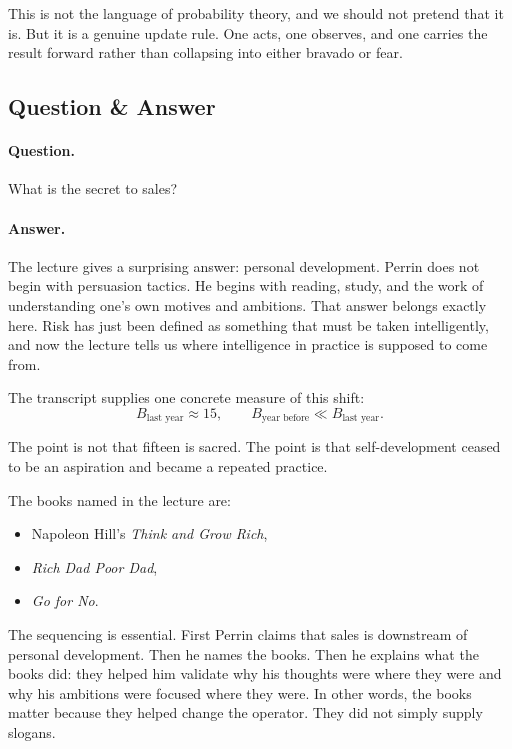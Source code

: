This is not the language of probability theory, and we should not pretend that it is. But it is a genuine update rule. One acts, one observes, and one carries the result forward rather than collapsing into either bravado or fear.

\subsection{Question \& Answer}

\paragraph{Question.} What is the secret to sales?

\paragraph{Answer.} The lecture gives a surprising answer: personal development. Perrin does not begin with persuasion tactics. He begins with reading, study, and the work of understanding one's own motives and ambitions. That answer belongs exactly here. Risk has just been defined as something that must be taken intelligently, and now the lecture tells us where intelligence in practice is supposed to come from.

The transcript supplies one concrete measure of this shift:
\begin{equation}
B_{\text{last year}} \approx 15,
\qquad
B_{\text{year before}} \ll B_{\text{last year}}.
\end{equation}

The point is not that fifteen is sacred. The point is that self-development ceased to be an aspiration and became a repeated practice.

The books named in the lecture are:
\begin{itemize}
\item Napoleon Hill's \textit{Think and Grow Rich},
\item \textit{Rich Dad Poor Dad},
\item \textit{Go for No}.
\end{itemize}

The sequencing is essential. First Perrin claims that sales is downstream of personal development. Then he names the books. Then he explains what the books did: they helped him validate why his thoughts were where they were and why his ambitions were focused where they were. In other words, the books matter because they helped change the operator. They did not simply supply slogans.

